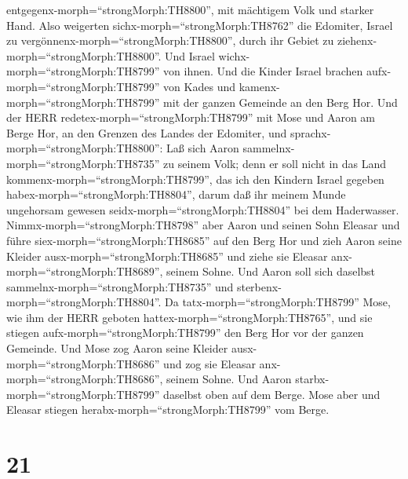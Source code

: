 entgegenx-morph=``strongMorph:TH8800'', mit mächtigem Volk und starker
Hand.  Also weigerten sichx-morph=``strongMorph:TH8762''
die Edomiter, Israel zu vergönnenx-morph=``strongMorph:TH8800'', durch
ihr Gebiet zu ziehenx-morph=``strongMorph:TH8800''. Und Israel
wichx-morph=``strongMorph:TH8799'' von ihnen.  Und die
Kinder Israel brachen aufx-morph=``strongMorph:TH8799'' von Kades und
kamenx-morph=``strongMorph:TH8799'' mit der ganzen Gemeinde an den Berg
Hor.  Und der HERR redetex-morph=``strongMorph:TH8799'' mit
Mose und Aaron am Berge Hor, an den Grenzen des Landes der Edomiter, und
sprachx-morph=``strongMorph:TH8800'':  Laß sich Aaron
sammelnx-morph=``strongMorph:TH8735'' zu seinem Volk; denn er soll nicht
in das Land kommenx-morph=``strongMorph:TH8799'', das ich den Kindern
Israel gegeben habex-morph=``strongMorph:TH8804'', darum daß ihr meinem
Munde ungehorsam gewesen seidx-morph=``strongMorph:TH8804'' bei dem
Haderwasser.  Nimmx-morph=``strongMorph:TH8798'' aber Aaron
und seinen Sohn Eleasar und führe siex-morph=``strongMorph:TH8685'' auf
den Berg Hor  und zieh Aaron seine Kleider
ausx-morph=``strongMorph:TH8685'' und ziehe sie Eleasar
anx-morph=``strongMorph:TH8689'', seinem Sohne. Und Aaron soll sich
daselbst sammelnx-morph=``strongMorph:TH8735'' und
sterbenx-morph=``strongMorph:TH8804''.  Da
tatx-morph=``strongMorph:TH8799'' Mose, wie ihm der HERR geboten
hattex-morph=``strongMorph:TH8765'', und sie stiegen
aufx-morph=``strongMorph:TH8799'' den Berg Hor vor der ganzen Gemeinde.
 Und Mose zog Aaron seine Kleider
ausx-morph=``strongMorph:TH8686'' und zog sie Eleasar
anx-morph=``strongMorph:TH8686'', seinem Sohne.  Und Aaron
starbx-morph=``strongMorph:TH8799'' daselbst oben auf dem Berge. Mose
aber und Eleasar stiegen herabx-morph=``strongMorph:TH8799'' vom Berge.

\hypertarget{section-20}{%
\section{21}\label{section-20}}

